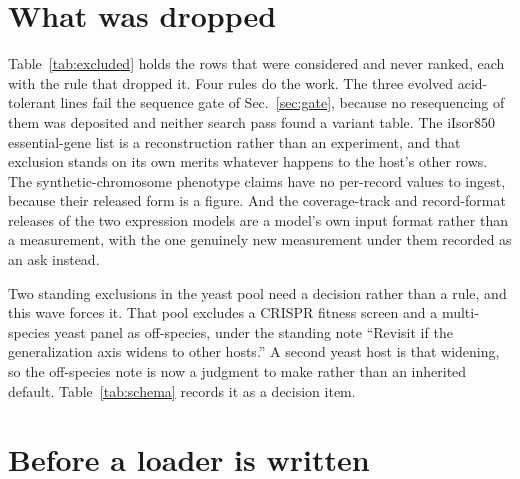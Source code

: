 
\section{What was dropped}\label{sec:excluded}



Table~\ref{tab:excluded} holds the rows that were considered and never ranked, each with the
rule that dropped it. Four rules do the work. The three evolved acid-tolerant lines fail the
sequence gate of Sec.~\ref{sec:gate}, because no resequencing of them was deposited and neither
search pass found a variant table. The iIsor850 essential-gene list is a reconstruction rather
than an experiment, and that exclusion stands on its own merits whatever happens to the host's
other rows. The synthetic-chromosome phenotype claims have no per-record values to ingest,
because their released form is a figure. And the coverage-track and record-format releases of
the two expression models are a model's own input format rather than a measurement, with the
one genuinely new measurement under them recorded as an ask instead.

Two standing exclusions in the yeast pool need a decision rather than a rule, and this wave
forces it. That pool excludes a  CRISPR fitness screen and a
multi-species yeast panel as off-species, under the standing note ``Revisit if the
generalization axis widens to other hosts.'' A second yeast host is that widening, so the
off-species note is now a judgment to make rather than an inherited default.
Table~\ref{tab:schema} records it as a decision item.

\section{Before a loader is written}\label{sec:caveats}

